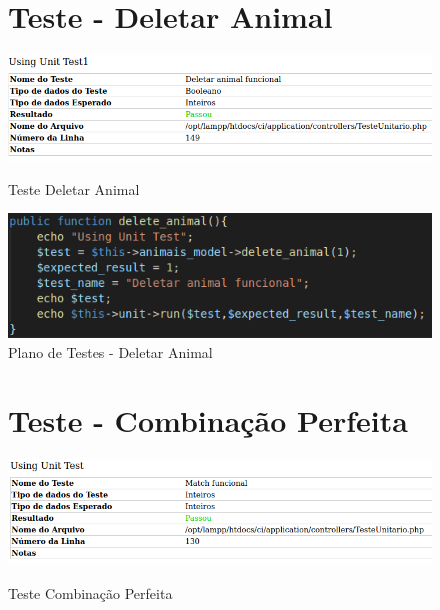 \begin{apendicesenv}
\begin{figure}[!htbp]
\begin{flushleft}
    \section{Teste - Deletar Animal}
\end{flushleft}
    \centering
    \caption{Teste Deletar Animal}
    \includegraphics[width=1\textwidth,pagecommand=\chapter{}]{imagens/teste_deletar_animal.png}
    \label{teste-deletar-animal}
\end{figure}

\begin{figure}[htb]
    \centering
    \caption{\label{fig_timeline}Plano de Testes - Deletar Animal}
	\includegraphics[width=1\textwidth]{imagens/cod_teste_delete_animal.png}
\end{figure}

\begin{figure}[!htbp]
\begin{flushleft}
    \section{Teste - Combinação Perfeita}
\end{flushleft}
    \centering
    \caption{Teste Combinação Perfeita}
    \includegraphics[width=1\textwidth,pagecommand=\chapter{}]{imagens/teste_match.png}
    \label{teste-match}
\end{figure}


\end{apendicesenv}
